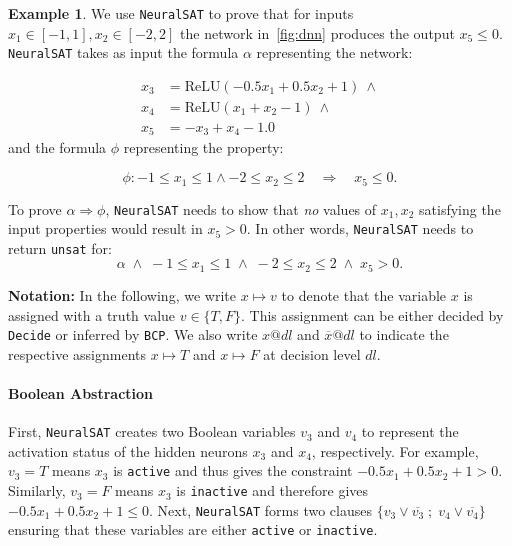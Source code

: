 \documentclass[oneside,11pt,dvipsnames]{book}
\numberwithin{equation}{section}
\theoremstyle{definition}
\newtheorem{example}{Example}[section]
\theoremstyle{remark}
\newcommand{\neuralsat}{\texttt{NeuralSAT}}
\newcommand{\relu}[1]{\mathrm{ReLU}\left(#1\right)}
\begin{document}
\begin{example}\label{ex:neuralsat}
We use \neuralsat{} to prove that for inputs $x_1 \in [-1, 1], x_2 \in [-2,2]$ the network in~\autoref{fig:dnn} produces the output $x_5 \le 0$.
\neuralsat{} takes as input the formula $\alpha$ representing the network:

\begin{equation*}%
\begin{aligned}
  x_3 &=  \relu{-0.5x_1 + 0.5x_2 + 1} ~\land\\
  x_4 &= \relu{x_1 + x_2 - 1} ~\land\\
  x_5 &= -x_3 + x_4 - 1.0
\end{aligned}
\end{equation*}
and the formula $\phi$ representing the property:

\begin{equation*}\label{eq:valid_prop}
    \phi : -1\le x_1 \le 1 \land -2 \le x_2 \le 2 \quad\Rightarrow\quad x_5 \le 0.
\end{equation*}

To prove $\alpha \Rightarrow \phi$, \neuralsat{} needs to show  that \emph{no} values of $x_1,x_2$ satisfying the input properties would result in $x_5 > 0$. In other words, \neuralsat{} needs to return \texttt{unsat} for:
\begin{equation}\label{eq:negprop}
  \alpha\; \land\; -1 \le x_1 \le 1     \;\land\; -2 \le x_2 \le 2   \;\land\; x_5 > 0.
\end{equation}

\textbf{Notation:} In the following, we write $x \mapsto v$ to denote that the variable $x$ is assigned with a truth value $v \in \{T,F\}$. This assignment can be either decided by \texttt{Decide} or inferred by \texttt{BCP}. We also write $x@dl$ and  $\overline{x}@dl$ to indicate the respective assignments $x \mapsto T$ and $x \mapsto F$  at decision level $dl$.

\paragraph{Boolean Abstraction} First, \neuralsat{} creates two Boolean variables $v_3$ and $v_4$ to represent the
activation status of the hidden neurons $x_3$ and $x_4$, respectively. For example, $v_3=T$ means $x_3$ is \texttt{active} and thus gives the constraint $-0.5x_1 + 0.5x_2 + 1 > 0$. Similarly, $v_3=F$ means $x_3$ is \texttt{inactive} and therefore gives $-0.5x_1 + 0.5x_2 + 1\le 0$. Next, \neuralsat{} forms two clauses  $\{v_3 \lor \overline{v_3} \;;\; v_4 \lor \overline{v_4}\}$ ensuring that these variables are either \texttt{active} or \texttt{inactive}.



\end{example}
\end{document}
